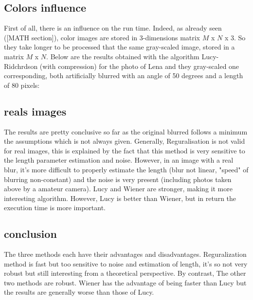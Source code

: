 \subsection{Colors influence}

First of all, there is an influence on the run time. Indeed, as already seen ([MATH section]), color images are stored in 3-dimensions matrix $M$ x $N$ x $3$. So they take longer to be processed that the same gray-scaled image, stored in a matrix $M$ x $N$.
Below are the results obtained with the algorithm Lucy-Ridchrdson (with compression) for the photo of Lena and they gray-scaled one corresponding, both artificially blurred with an angle of 50 degrees and a length of 80 pixels:


 

\subsection{reals images}

 
The results are pretty conclusive so far as the original blurred follows a minimum the assumptions which is not always given. Generally, Reguralisation is not valid for real images, this is explained by the fact that this method is very sensitive to the length parameter estimation and noise. However, in an image with a real blur, it's more difficult to properly estimate the length (blur not linear, "speed" of blurring non-constant) and the noise is very present (including photos taken above by a amateur camera). Lucy and Wiener are stronger, making it more interesting algorithm. However, Lucy is better than Wiener, but in return the execution time is more important.

\subsection{conclusion}

The three methods each have their advantages and disadvantages. Reguralization method is fast but too sensitive to noise and estimation of length, it's so not very robust but still interesting from a theoretical perspective. By contrast, The other two methods are robust. Wiener has the advantage of being faster than Lucy but the results are generally worse than those of Lucy.